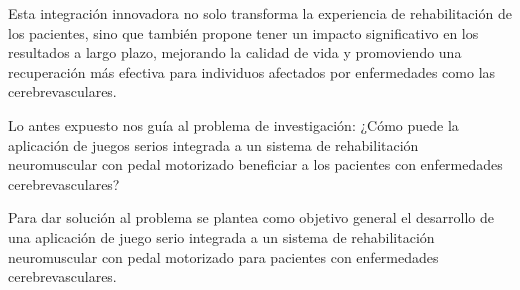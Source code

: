 \begin{introduction}
    \vspace{5pt}
    Esta integración innovadora no solo 
    transforma la experiencia de rehabilitación de los pacientes, sino que también propone tener un impacto 
    significativo en los resultados a largo plazo, mejorando la calidad de vida y promoviendo una recuperación 
    más efectiva para individuos afectados por enfermedades como las cerebrevasculares.

    \vspace{5pt}

    Lo antes expuesto nos guía al problema de investigación: ¿Cómo puede la aplicación de juegos serios integrada a un sistema de 
    rehabilitación neuromuscular con pedal motorizado beneficiar a los pacientes con enfermedades cerebrevasculares?



    \vspace{5pt}
    Para dar solución al problema se plantea como objetivo general el desarrollo de una aplicación de juego serio integrada a un sistema de 
    rehabilitación neuromuscular con pedal motorizado para pacientes con enfermedades cerebrevasculares.
    

\end{introduction}
